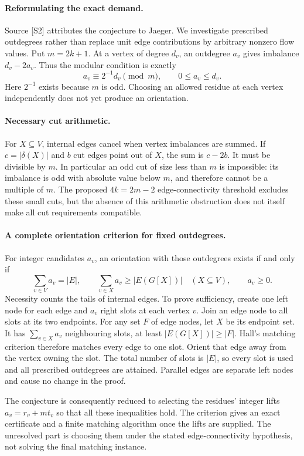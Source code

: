 \documentclass[11pt,a4paper]{article}
\begin{document}
\paragraph{Reformulating the exact demand.}
Source [S2] attributes the conjecture to Jaeger. We investigate prescribed
outdegrees rather than replace unit edge contributions by arbitrary
nonzero flow values. Put $m=2k+1$. At a vertex of degree $d_v$, an
outdegree $a_v$ gives imbalance $d_v-2a_v$. Thus the modular condition
is exactly
\[
 a_v\equiv 2^{-1}d_v\pmod m,\qquad 0\le a_v\le d_v.
\]
Here $2^{-1}$ exists because $m$ is odd. Choosing an allowed residue at
each vertex independently does not yet produce an orientation.

\paragraph{Necessary cut arithmetic.}
For $X\subseteq V$, internal edges cancel when vertex imbalances are
summed. If $c=|\delta(X)|$ and $b$ cut edges point out of $X$, the sum
is $c-2b$. It must be divisible by $m$. In particular an odd cut of
size less than $m$ is impossible: its imbalance is odd with absolute
value below $m$, and therefore cannot be a multiple of $m$.
The proposed $4k=2m-2$ edge-connectivity threshold excludes these small
cuts, but the absence of this arithmetic obstruction does not itself
make all cut requirements compatible.

\paragraph{A complete orientation criterion for fixed outdegrees.}
For integer candidates $a_v$, an orientation with those outdegrees exists
if and only if
\[
 \sum_{v\in V}a_v=|E|,\qquad
 \sum_{v\in X}a_v\ge |E(G[X])|\quad(X\subseteq V),
 \qquad a_v\ge0.
\]
Necessity counts the tails of internal edges. To prove sufficiency, create
one left node for each edge and $a_v$ right slots at each vertex $v$.
Join an edge node to all slots at its two endpoints. For any set $F$ of
edge nodes, let $X$ be its endpoint set. It has $\sum_{v\in X}a_v$
neighbouring slots, at least $|E(G[X])|\ge |F|$. Hall's matching criterion
therefore matches every edge to one slot. Orient that edge away from the
vertex owning the slot. The total number of slots is $|E|$, so every
slot is used and all prescribed outdegrees are attained. Parallel edges
are separate left nodes and cause no change in the proof.

The conjecture is consequently reduced to selecting the residues' integer
lifts $a_v=r_v+mt_v$ so that all these inequalities hold. The criterion
gives an exact certificate and a finite matching algorithm once the lifts
are supplied. The unresolved part is choosing them under the stated
edge-connectivity hypothesis, not solving the final matching instance.
\end{document}
